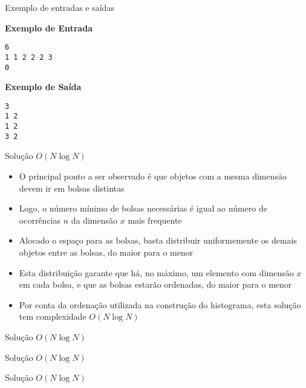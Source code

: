 \begin{frame}[fragile]{Exemplo de entradas e saídas}

\begin{minipage}[t]{0.5\textwidth}
\textbf{Exemplo de Entrada}
\begin{verbatim}
6
1 1 2 2 2 3
0
\end{verbatim}
\end{minipage}
\begin{minipage}[t]{0.45\textwidth}
\textbf{Exemplo de Saída}
\begin{verbatim}
3
1 2
1 2
3 2
\end{verbatim}
\end{minipage}
\end{frame}

\begin{frame}[fragile]{Solução $O(N\log N)$}

    \begin{itemize}
        \item O principal ponto a ser observado é que objetos com a mesma dimensão devem ir
            em bolsas distintas

        \item Logo, o número mínimo de bolsas necessárias é igual ao número de ocorrências $n$ da
            dimensão $x$ mais frequente

        \item Alocado o espaço para as bolsas, basta distribuir uniformemente os demais objetos 
            entre as bolsas, do maior para o menor

        \item Esta distribuição garante que há, no máximo, um elemento com dimensão $x$ em cada
            bolsa, e que as bolsas estarão ordenadas, do maior para o menor

        \item Por conta da ordenação utilizada na construção do histograma, esta solução tem 
            complexidade $O(N\log N)$
   \end{itemize}

\end{frame}

\begin{frame}[fragile]{Solução $O(N\log N)$}
\end{frame}

\begin{frame}[fragile]{Solução $O(N\log N)$}
\end{frame}

\begin{frame}[fragile]{Solução $O(N\log N)$}
\end{frame}
